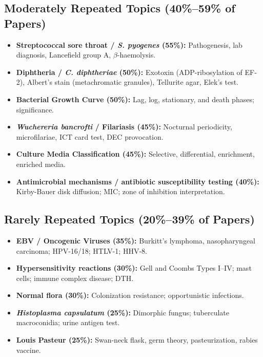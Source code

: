 \documentclass[11pt,a4paper]{article}
\begin{document}
\subsection{Moderately Repeated Topics (40\%--59\% of Papers)}
\begin{itemize}[leftmargin=*]
    \item \textbf{Streptococcal sore throat / \textit{S. pyogenes} (55\%):} Pathogenesis, lab diagnosis, Lancefield group A, $\beta$-haemolysis.
    \item \textbf{Diphtheria / \textit{C. diphtheriae} (50\%):} Exotoxin (ADP-ribosylation of EF-2), Albert's stain (metachromatic granules), Tellurite agar, Elek's test.
    \item \textbf{Bacterial Growth Curve (50\%):} Lag, log, stationary, and death phases; significance.
    \item \textbf{\textit{Wuchereria bancrofti} / Filariasis (45\%):} Nocturnal periodicity, microfilariae, ICT card test, DEC provocation.
    \item \textbf{Culture Media Classification (45\%):} Selective, differential, enrichment, enriched media.
    \item \textbf{Antimicrobial mechanisms / antibiotic susceptibility testing (40\%):} Kirby-Bauer disk diffusion; MIC; zone of inhibition interpretation.
\end{itemize}

\subsection{Rarely Repeated Topics (20\%--39\% of Papers)}
\begin{itemize}[leftmargin=*]
    \item \textbf{EBV / Oncogenic Viruses (35\%):} Burkitt's lymphoma, nasopharyngeal carcinoma; HPV-16/18; HTLV-1; HHV-8.
    \item \textbf{Hypersensitivity reactions (30\%):} Gell and Coombs Types I--IV; mast cells; immune complex disease; DTH.
    \item \textbf{Normal flora (30\%):} Colonization resistance; opportunistic infections.
    \item \textbf{\textit{Histoplasma capsulatum} (25\%):} Dimorphic fungus; tuberculate macroconidia; urine antigen test.
    \item \textbf{Louis Pasteur (25\%):} Swan-neck flask, germ theory, pasteurization, rabies vaccine.
\end{itemize}
\end{document}
